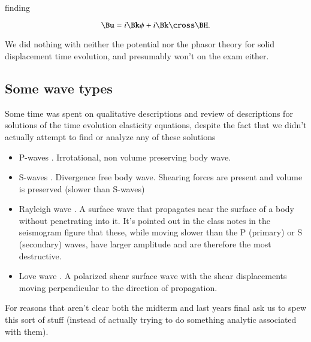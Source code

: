 finding

\begin{equation}\label{eqn:continuumElasticityReview:810}
\Bu = i \Bk \phi + i \Bk \cross \BH.
\end{equation}

We did nothing with neither the potential nor the phasor theory for solid displacement time evolution, and presumably won't on the exam either.

\subsection{Some wave types}

Some time was spent on qualitative descriptions and review of descriptions for solutions of the time evolution elasticity equations, despite the fact that we didn't actually attempt to find or analyze any of these solutions

\begin{itemize}
\item P-waves \citep{wiki:pwave}.  Irrotational, non volume preserving body wave.
\item S-waves \citep{wiki:swave}.  Divergence free body wave.  Shearing forces are present and volume is preserved (slower than S-waves)
\item Rayleigh wave \citep{wiki:rayleighwave}.  A surface wave that propagates near the surface of a body without penetrating into it.  It's pointed out in the class notes in the seismogram figure that these, while moving slower than the P (primary) or S (secondary) waves, have larger amplitude and are therefore the most destructive.
\item Love wave \citep{wiki:lovewave}.  A polarized shear surface wave with the shear displacements moving perpendicular to the direction of propagation.
\end{itemize}

For reasons that aren't clear both the midterm and last years final ask us to spew this sort of stuff (instead of actually trying to do something analytic associated with them).
